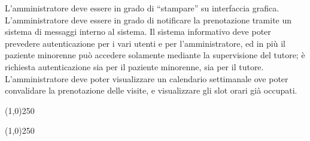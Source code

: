\begin{description}
\begin{itemize}
        \diam L'amministratore deve essere in grado di ``stampare'' su interfaccia grafica.
\diam L'amministratore deve essere in grado di notificare la prenotazione tramite
	un sistema di messaggi interno al sistema.
\diam Il sistema informativo deve poter prevedere autenticazione per i vari
	utenti e per l'amministratore, ed in più il paziente minorenne può accedere solamente mediante
	la supervisione del tutore; è richiesta autenticazione  sia per il
	paziente minorenne, sia per il tutore.
\diam L'amministratore deve poter visualizzare un calendario settimanale ove
	poter convalidare la prenotazione delle visite, e visualizzare gli slot
	orari già occupati.
\end{itemize}       
\end{description}


\begin{center}
\line(1,0){250}
\end{center}

\pagebreak

\begin{center}
\line(1,0){250}
\end{center}


